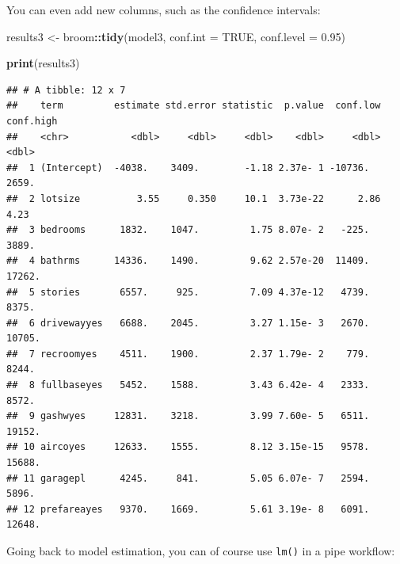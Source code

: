 \documentclass[]{gitbook}
\newenvironment{Shaded}{\begin{snugshade}}{\end{snugshade}}
\newcommand{\DataTypeTok}[1]{\textcolor[rgb]{0.13,0.29,0.53}{#1}}
\newcommand{\FloatTok}[1]{\textcolor[rgb]{0.00,0.00,0.81}{#1}}
\newcommand{\KeywordTok}[1]{\textcolor[rgb]{0.13,0.29,0.53}{\textbf{#1}}}
\newcommand{\NormalTok}[1]{#1}
\newcommand{\OperatorTok}[1]{\textcolor[rgb]{0.81,0.36,0.00}{\textbf{#1}}}
\newcommand{\OtherTok}[1]{\textcolor[rgb]{0.56,0.35,0.01}{#1}}
\newcommand{\StringTok}[1]{\textcolor[rgb]{0.31,0.60,0.02}{#1}}
\theoremstyle{definition}
\theoremstyle{definition}
\theoremstyle{definition}
\theoremstyle{remark}
\begin{document}
You can even add new columns, such as the confidence intervals:

\begin{Shaded}
\begin{Highlighting}[]
\NormalTok{results3 <-}\StringTok{ }\NormalTok{broom}\OperatorTok{::}\KeywordTok{tidy}\NormalTok{(model3, }\DataTypeTok{conf.int =} \OtherTok{TRUE}\NormalTok{, }\DataTypeTok{conf.level =} \FloatTok{0.95}\NormalTok{)}

\KeywordTok{print}\NormalTok{(results3)}
\end{Highlighting}
\end{Shaded}

\begin{verbatim}
## # A tibble: 12 x 7
##    term         estimate std.error statistic  p.value  conf.low conf.high
##    <chr>           <dbl>     <dbl>     <dbl>    <dbl>     <dbl>     <dbl>
##  1 (Intercept)  -4038.    3409.        -1.18 2.37e- 1 -10736.     2659.  
##  2 lotsize          3.55     0.350     10.1  3.73e-22      2.86      4.23
##  3 bedrooms      1832.    1047.         1.75 8.07e- 2   -225.     3889.  
##  4 bathrms      14336.    1490.         9.62 2.57e-20  11409.    17262.  
##  5 stories       6557.     925.         7.09 4.37e-12   4739.     8375.  
##  6 drivewayyes   6688.    2045.         3.27 1.15e- 3   2670.    10705.  
##  7 recroomyes    4511.    1900.         2.37 1.79e- 2    779.     8244.  
##  8 fullbaseyes   5452.    1588.         3.43 6.42e- 4   2333.     8572.  
##  9 gashwyes     12831.    3218.         3.99 7.60e- 5   6511.    19152.  
## 10 aircoyes     12633.    1555.         8.12 3.15e-15   9578.    15688.  
## 11 garagepl      4245.     841.         5.05 6.07e- 7   2594.     5896.  
## 12 prefareayes   9370.    1669.         5.61 3.19e- 8   6091.    12648.
\end{verbatim}

Going back to model estimation, you can of course use \texttt{lm()} in a
pipe workflow:

\begin{Shaded}
\end{Shaded}
\end{document}
